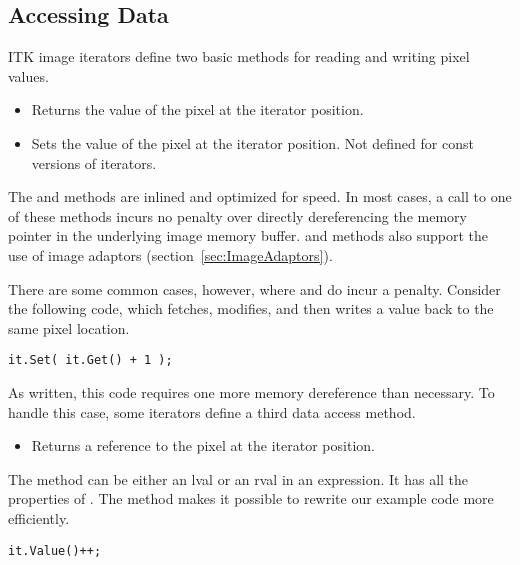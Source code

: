 \subsection{Accessing Data}
\label{sec:AccessingData}
ITK image iterators define two basic methods for reading and writing pixel
values.

\begin{itemize}
\item \textbf{} Returns the value of the pixel at the
iterator position.

\item \textbf{} Sets the value of the pixel at the
iterator position.  Not defined for const versions of iterators.
\end{itemize}

The  and  methods are inlined and optimized for speed. In
most cases, a call to one of these methods incurs no penalty over directly
dereferencing the memory pointer in the underlying image memory buffer.
 and  methods also support the use of image adaptors
(section~\ref{sec:ImageAdaptors}).

There are some common cases, however, where  and  do incur a
penalty. Consider the following code, which fetches, modifies, and then writes
a value back to the same pixel location.

\small
\begin{verbatim}
it.Set( it.Get() + 1 );
\end{verbatim}
\normalsize

As written, this code requires one more memory dereference than necessary.  To
handle this case, some iterators define a third data access method.

\begin{itemize}
\item \textbf{} Returns a reference to the pixel at
the iterator position.
\end{itemize}

The  method can be either an lval or an rval in an expression.  It
has all the properties of .  The  method makes it
possible to rewrite our example code more efficiently.

\small
\begin{verbatim}
it.Value()++;
\end{verbatim}
\normalsize


